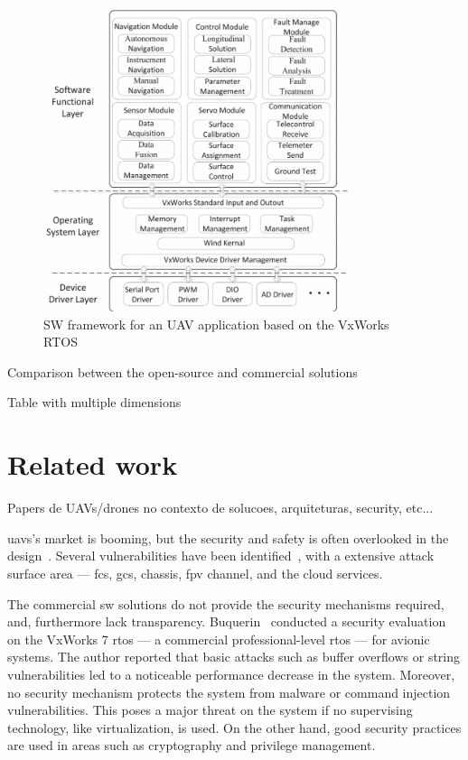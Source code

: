 \begin{figure}[!hbt]
  \centering
  \includegraphics[width=0.8\textwidth]{./img/png/vxworks-sw-arch.png} 
  \caption[SW framework for an UAV application based on the VxWorks
    RTOS~]{SW framework for an UAV application based on the VxWorks
    RTOS~\cite{vxworksFCS}\footnotemark}%
  \label{fig:vxworks-sw-arch}
\end{figure}
%
%

\label{sec:gap-analysis-sw}
Comparison between the open-source and commercial solutions

Table with multiple dimensions

\section{Related work}%
\label{sec:related-work}
Papers de UAVs/drones no contexto de solucoes, arquiteturas, security, etc...

\glspl{uav}'s market is booming, but the security and safety is often overlooked
in the design~\cite{ferrao2020stuart}. Several vulnerabilities have been
identified~\cite{kishnaCyberVulnerUAVReview2017,nassi2021sok,mohsan2022towards},
with a extensive attack surface area --- \gls{fcs}, \gls{gcs}, chassis, \gls{fpv}
channel, and the cloud services.

The commercial \gls{sw} solutions do not provide the security mechanisms
required, and, furthermore lack transparency. 
%
Buquerin~\cite{buquerin2018security} conducted a security evaluation on the
VxWorks 7 \gls{rtos} --- a commercial professional-level \gls{rtos} --- for
avionic systems. The author reported that basic attacks such as
buffer overflows or string vulnerabilities led to a noticeable performance
decrease in the system. Moreover, no security mechanism protects the system
from malware or command injection vulnerabilities. This poses a major threat on
the system if no supervising technology, like virtualization, is used. On the other hand, good security practices are used in
areas such as cryptography and privilege management.

